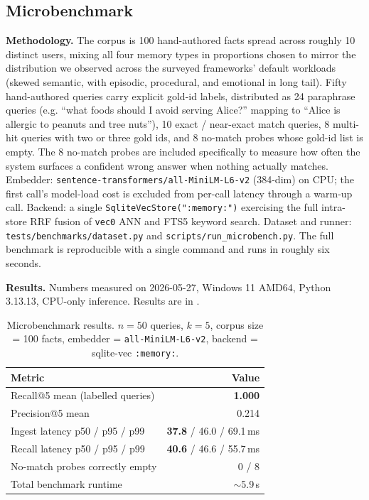 \documentclass[11pt,letterpaper,twocolumn]{article}
\begin{document}
\subsection{Microbenchmark}
\label{sec:eval-micro}

\textbf{Methodology.} The corpus is 100 hand-authored facts spread across roughly 10 distinct users, mixing all four memory types in proportions chosen to mirror the distribution we observed across the surveyed frameworks' default workloads (skewed semantic, with episodic, procedural, and emotional in long tail). Fifty hand-authored queries carry explicit gold-id labels, distributed as 24 paraphrase queries (e.g. ``what foods should I avoid serving Alice?'' mapping to ``Alice is allergic to peanuts and tree nuts''), 10 exact / near-exact match queries, 8 multi-hit queries with two or three gold ids, and 8 no-match probes whose gold-id list is empty. The 8 no-match probes are included specifically to measure how often the system surfaces a confident wrong answer when nothing actually matches. Embedder: \texttt{sentence-transformers/all-MiniLM-L6-v2} (384-dim) on CPU; the first call's model-load cost is excluded from per-call latency through a warm-up call. Backend: a single \texttt{SqliteVecStore(":memory:")} exercising the full intra-store RRF fusion of \texttt{vec0} ANN and FTS5 keyword search. Dataset and runner: \texttt{tests/benchmarks/dataset.py} and \texttt{scripts/run\_microbench.py}. The full benchmark is reproducible with a single command and runs in roughly six seconds.

\textbf{Results.} Numbers measured on 2026-05-27, Windows 11 AMD64, Python 3.13.13, CPU-only inference. Results are in .

\begin{table}[t]
\centering
\caption{Microbenchmark results. $n=50$ queries, $k=5$, corpus size = 100 facts, embedder = \texttt{all-MiniLM-L6-v2}, backend = sqlite-vec \texttt{:memory:}.}
\label{tab:microbench}
\small
\begin{tabular}{lr}
\toprule
\textbf{Metric} & \textbf{Value} \\
\midrule
Recall@5 mean (labelled queries) & \textbf{1.000} \\
Precision@5 mean & 0.214 \\
Ingest latency p50 / p95 / p99 & \textbf{37.8} / 46.0 / 69.1\,ms \\
Recall latency p50 / p95 / p99 & \textbf{40.6} / 46.6 / 55.7\,ms \\
No-match probes correctly empty & 0 / 8 \\
Total benchmark runtime & $\sim$5.9\,s \\
\bottomrule
\end{tabular}
\end{table}
\end{document}
